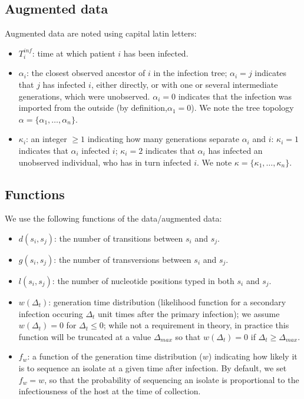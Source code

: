 \documentclass[10pt]{article}
\begin{document}
\subsection*{Augmented data}
Augmented data are noted using capital latin letters:
\begin{itemize}
	\item $T_i^{inf}$: time at which patient $i$ has been infected.
	\item $\alpha_i$: the closest observed ancestor of $i$ in the infection tree; $\alpha_i=j$ indicates that $j$ has infected $i$, either directly, or with one or several intermediate generations, which were unobserved. $\alpha_i=0$ indicates that the infection was imported from the outside (by definition,$\alpha_1=0$). 
We note the tree topology $\alpha = \{\alpha_1, \ldots, \alpha_n\}$.
 	\item $\kappa_i$: an integer $\geq 1$ indicating how many generations separate $\alpha_i$ and $i$: $\kappa_i=1$ indicates that $\alpha_i$ infected $i$; $\kappa_i=2$ indicates that $\alpha_i$ has infected an unobserved individual, who has in turn infected $i$.
We note $\kappa = \{\kappa_1, \ldots, \kappa_n\}$.

\end{itemize}




\subsection*{Functions}
We use the following functions of the data/augmented data:
\begin{itemize}
  \item $d(s_i,s_j)$: the number of transitions between $s_i$ and $s_j$.
  \item $g(s_i,s_j)$: the number of transversions between $s_i$ and $s_j$.
  \item $l(s_i,s_j)$: the number of nucleotide positions typed in both $s_i$ and $s_j$.
  \item $w(\Delta_t)$: generation time distribution (likelihood function for a secondary infection occuring $\Delta_t$ unit times after the primary infection); we assume $w(\Delta_t)=0$ for $\Delta_t \leq 0$; while not a requirement in theory, in practice this function will be truncated at a value $\Delta_{max}$ so that $w(\Delta_t)=0$ if $\Delta_t \geq \Delta_{max}$.
  \item $f_w$: a function of the generation time distribution ($w$) indicating how likely it is to sequence an isolate at a given time after infection. By default, we set $f_w=w$, so that the probability of sequencing an isolate is proportional to the infectiousness of the host at the time of collection.
\end{itemize}
\end{document}
